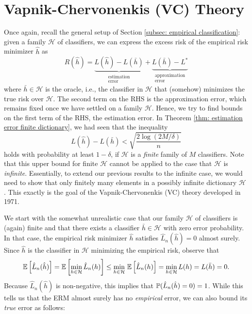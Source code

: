 \chapter{Vapnik-Chervonenkis (VC) Theory}
\label{ch: VC theory}

Once again, recall the general setup of Section \ref{subsec: empirical classification}: given a family $\mathcal{H}$ of classifiers, we can express the excess risk of the empirical risk minimizer $\hat h$ as
\[
    R(\hat h) = \underbrace{L(\hat h) - L(\bar h)}_{\substack{\text{estimation} \\ \text{error}}} + \underbrace{L(\bar h) - L^*}_{\substack{\text{approximation} \\ \text{error}}}
\]
where $\bar h \in \mathcal{H}$ is the oracle, i.e., the classifier in $\mathcal{H}$ that (somehow) minimizes the true risk over $\mathcal{H}$. The second term on the RHS is the approximation error, which remains fixed once we have settled on a family $\mathcal{H}$. Hence, we try to find bounds on the first term of the RHS, the estimation error. In Theorem \ref{thm: estimation error finite dictionary}, we had seen that the inequality
\[
    L(\hat h) - L(\bar h) < \sqrt{\frac{2 \log(2M / \delta)}{n}}
\]
holds with probability at least $1 - \delta$, if $\mathcal{H}$ is a \emph{finite} family of $M$ classifiers. Note that this upper bound for finite $\mathcal{H}$ cannot be applied to the case that $\mathcal{H}$ is \emph{infinite}. Essentially, to extend our previous results to the infinite case, we would need to show that only finitely many elements in a possibly infinite dictionary $\mathcal{H}$ . This exactly is the goal of the Vapnik-Chervonenkis (VC) theory developed in 1971.

We start with the somewhat unrealistic case that our family $\mathcal{H}$ of classifiers is (again) finite and that there exists a classifier $\bar h \in \mathcal{H}$ with zero error probability. In that case, the empirical risk minimizer $\hat h$ satisfies $\hat L_n(\hat h) = 0$ almost surely. Since $\hat h$ is the classifier in $\mathcal{H}$ minimizing the empirical risk, observe that
\[
    \Ex{\hat L_n(\hat h)} = \Ex{\min_{h \in \mathcal{H}} \hat L_n(h)} \leq \min_{h \in \mathcal{H}} \, \Ex{\hat L_n(h)} = \min_{h \in \mathcal{H}} L(h) = L(\bar h) = 0.
\]
Because $\hat L_n(\hat h)$ is non-negative, this implies that $\P(\hat L_n(\hat h) = 0) = 1$. While this tells us that the ERM almost surely has no \emph{empirical} error, we can also bound its \emph{true} error as follows:

